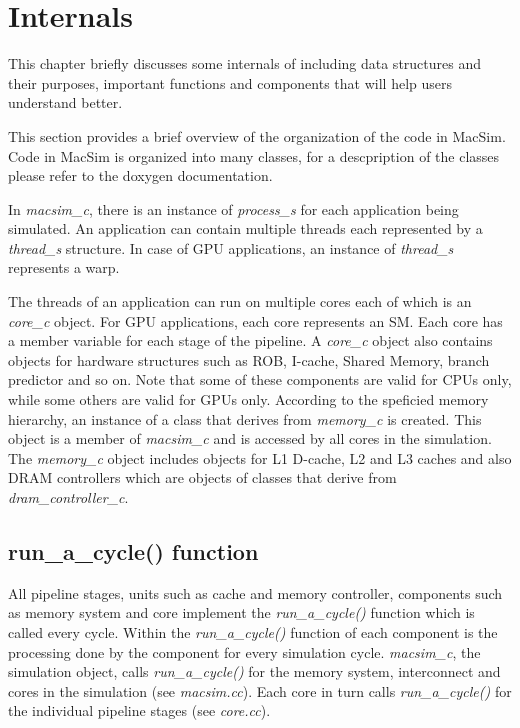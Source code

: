
\chapter{\SIM Internals}
\label{sec:codetop}

This chapter briefly discusses some internals of \SIM including data structures
and their purposes, important functions and components that will help users
understand \SIM better.

\ignore
{
This section provides a brief overview of the organization of the code in
MacSim. Code in MacSim is organized into many classes, for a descpription of
the classes please refer to the doxygen documentation.


In
\textit{macsim\_c}, there is an instance of \textit{process\_s} for each
application being simulated. An application can contain multiple threads each
represented by a \textit{thread\_s} structure. In case of GPU applications, an
instance of \textit{thread\_s} represents a warp. 

The threads of an application
can run on multiple cores each of which is an \textit{core\_c} object. For GPU
applications, each core represents an SM. Each core has a member variable for
each stage of the pipeline.  A \textit{core\_c} object also contains objects
for hardware structures such as ROB, I-cache, Shared Memory, branch predictor
and so on. Note that some of these components are valid for CPUs only, while
some others are valid for GPUs only.  According to the speficied memory
hierarchy, an instance of a class that derives from \textit{memory\_c} is
created. This object is a member of \textit{macsim\_c} and is accessed by all
cores in the simulation. The \textit{memory\_c} object includes objects for L1
D-cache, L2 and L3 caches and also DRAM controllers which are objects of
classes that derive from \textit{dram\_controller\_c}. 

}

\section{run\_a\_cycle() function}

All pipeline stages, units such as cache and memory controller, components such
as memory system and core implement the \textit{run\_a\_cycle()} function which
is called every cycle. Within the \textit{run\_a\_cycle()} function of each
component is the processing done by the component for every simulation cycle.
\textit{macsim\_c}, the simulation object, calls \textit{run\_a\_cycle()} for
the memory system, interconnect and cores in the simulation (see
    \textit{macsim.cc}). Each core in turn calls \textit{run\_a\_cycle()} for
the individual pipeline stages (see \textit{core.cc}).



